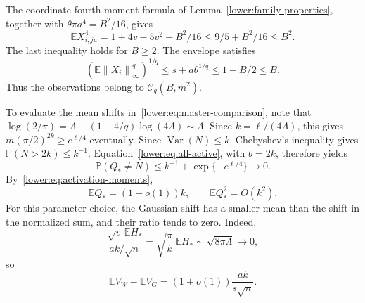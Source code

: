 \documentclass[11pt,letterpaper]{article}
\newenvironment{recovered}{}{}
\theoremstyle{remark}
\newcommand{\E}{\mathbb E}
\newcommand{\Pp}{\mathbb P}
\newcommand{\Var}{\operatorname{Var}}
\newcommand{\norm}[1]{\left\lVert#1\right\rVert}
\begin{document}
\begin{recovered}
The coordinate fourth-moment formula of
Lemma~\ref{lower:family-properties}, together with
\end{recovered}
\(\theta\pi a^4=B^2/16\), gives
\begin{equation}
 \E X_{i,ju}^4
 =1+4v-5v^2+B^2/16\le9/5+B^2/16\le B^2.
 \label{q4:eq:sparse-coordinate-moments}
\end{equation}
The last inequality holds for \(B\ge2\). The envelope satisfies
\begin{equation}
 (\E\norm{X_i}_\infty^q)^{1/q}
 \le s+a\theta^{1/q}\le1+B/2\le B.
 \label{q4:eq:sparse-envelope-moment}
\end{equation}
Thus the observations belong to \(\mathcal C_q(B,m^2)\).

To evaluate the mean shifts in~\eqref{lower:eq:master-comparison},
note that
\(\log(2/\pi)=\Lambda-(1-4/q)\log(4\Lambda)\sim\Lambda\).
Since \(k=\ell/(4\Lambda)\), this gives
\(m(\pi/2)^{2k}\ge e^{\ell/4}\) eventually.
\begin{recovered}
Since \(\Var(N)\le k\), Chebyshev's inequality gives
\(\Pp(N>2k)\le k^{-1}\). Equation~\eqref{lower:eq:all-active},
with \(b=2k\), therefore yields
\end{recovered}
\[
 \Pp(Q_*\ne N)\le k^{-1}+\exp\{-e^{\ell/4}\}\longrightarrow0.
\]
By~\eqref{lower:eq:activation-moments},
\begin{equation}
 \E Q_*=(1+o(1))k,\qquad \E Q_*^2=O(k^2).
 \label{q4:eq:sparse-max-moments}
\end{equation}
\begin{recovered}
For this parameter choice, the Gaussian shift has a smaller mean
than the shift in the normalized sum, and their ratio tends to zero.
Indeed,
\end{recovered}
\[
 \frac{\sqrt v\,\E H_*}{ak/\sqrt n}
 =\sqrt{\frac\pi k}\,\E H_*
 \sim\sqrt{8\pi\Lambda}\longrightarrow0,
\]
so
\begin{equation}
 \E V_W-\E V_G=(1+o(1))\frac{ak}{s\sqrt n}.
 \label{q4:eq:sparse-mean-gap}
\end{equation}
\end{document}

